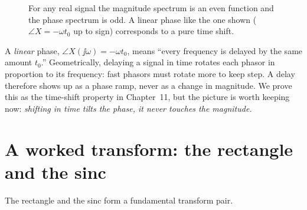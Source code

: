 \begin{figure}[H]
\centering
{}
\caption{For any real signal the magnitude spectrum is an even function and the phase
spectrum is odd. A linear phase like the one shown ($\angle X = -\omega t_0$ up to sign)
corresponds to a pure time shift.}
\label{ch07:fig-magphase}
\end{figure}

\begin{intuitionbox}
A \emph{linear} phase, $\angle X(\jj\omega) = -\omega t_0$, means ``every frequency is
delayed by the same amount $t_0$.'' Geometrically, delaying a signal in time rotates each
phasor in proportion to its frequency: fast phasors must rotate more to keep step. A
delay therefore shows up as a phase ramp, never as a change in magnitude. We prove this
as the time-shift property in Chapter~11, but the picture is worth keeping
now: \emph{shifting in time tilts the phase, it never touches the magnitude.}
\end{intuitionbox}

\section{A worked transform: the rectangle and the sinc}
\label{ch07:rect-sinc}

The rectangle and the sinc form a fundamental transform pair.

